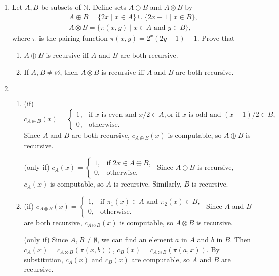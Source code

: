 \documentclass[12pt,a4paper]{article}
\makeatletter
\newtheorem*{solution}{Solution}
\theoremstyle{definition}
\numberwithin{equation}{section}
\numberwithin{figure}{section}
\renewenvironment{solution}[1][Solution] {\par\pushQED{\qed}\normalfont\topsep6\p@\@plus6\p@\relax\trivlist\item[\hskip\labelsep\bfseries#1\@addpunct{.}]\ignorespaces}{\popQED\endtrivlist\@endpefalse} \makeatother
\makeatother
\begin{document}
\begin{enumerate}
\item Let $A,B$ be subsets of $\mathbb{N}$. Define sets $A\oplus B$ and $A\otimes B$ by
$$
\begin{array}{l}
A\oplus B=\{2x \mid x\in A\}\cup\{2x+1 \mid x\in B\},\\[3pt]
A\otimes B=\{\pi (x,y) \mid x\in A \mbox{ and } y\in B\},
\end{array}$$
where $\pi$ is the pairing function $\pi(x,y)=2^x(2y+1)-1$. Prove that
  \begin{enumerate}
  \item $A\oplus B$ is recursive iff $A$ and $B$ are both recursive.
  \item If $A,B\neq\varnothing$, then $A\otimes B$ is recursive iff $A$ and $B$ are both recursive.
  \end{enumerate}

  \begin{solution}
  $ $
  \begin{enumerate}
  \item (if) $c_{A\oplus B}(x)=\left\{\begin{array}{ll}
    1, & \mbox{if } x \mbox{ is even and } x/2\in A, \mbox{or if } x \mbox{ is odd and } (x-1)/2\in B,\\
    0, & \mbox{otherwise.}
    \end{array}\right.$
    Since $A$ and $B$ are both recursive, $c_{A\oplus B}(x)$ is computable, so $A\oplus B$ is recursive.

    (only if) $c_{A}(x)=\left\{\begin{array}{ll}
    1, & \mbox{if } 2x \in A\oplus B,\\
    0, & \mbox{otherwise.}
    \end{array}\right.$
    Since $A\oplus B$ is recursive, $c_{A}(x)$ is computable, so $A$ is recursive. Similarly, $B$ is recursive.
  \item (if) $c_{A\otimes B}(x)=\left\{\begin{array}{ll}
    1, & \mbox{if } \pi_1(x)\in A \mbox{ and } \pi_2(x)\in B,\\
    0, & \mbox{otherwise.}
    \end{array}\right.$
    Since $A$ and $B$ are both recursive, $c_{A\otimes B}(x)$ is computable, so $A\otimes B$ is recursive.

    (only if) Since $A,B\ne \emptyset$, we can find an element $a$ in $A$ and $b$ in $B$. Then $c_{A}(x)=c_{A\otimes B}(\pi(x,b))$, $c_{B}(x)=c_{A\otimes B}(\pi(a,x))$. By substitution, $c_{A}(x)$ and $c_{B}(x)$ are computable, so $A$ and $B$ are recursive.
  \end{enumerate}
  \end{solution}


\end{enumerate}
\end{document}
